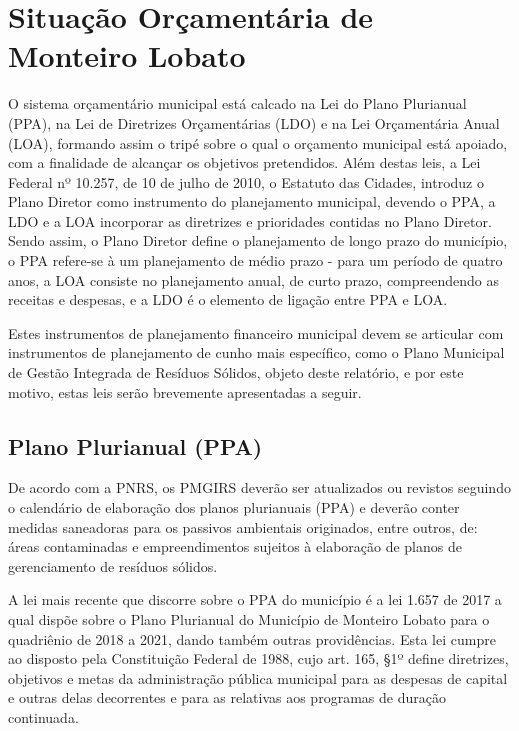 	\section{Situação Orçamentária de Monteiro Lobato}
	
	O sistema orçamentário municipal está calcado na Lei do Plano Plurianual (PPA), na Lei de Diretrizes Orçamentárias (LDO) e na Lei Orçamentária Anual (LOA), formando assim o tripé sobre o qual o orçamento municipal está apoiado, com a finalidade de alcançar os objetivos pretendidos. Além destas leis, a Lei Federal nº 10.257, de 10 de julho de 2010, o Estatuto das Cidades, introduz o Plano Diretor como instrumento do planejamento municipal, devendo o PPA, a LDO e a LOA incorporar as diretrizes e prioridades contidas no Plano Diretor. Sendo assim, o Plano Diretor define o planejamento de longo prazo do município, o PPA refere-se à um planejamento de médio prazo - para um período de quatro anos, a LOA consiste no planejamento anual, de curto prazo, compreendendo as receitas e despesas, e a LDO é o elemento de ligação entre PPA e LOA. 
	
	Estes instrumentos de planejamento financeiro municipal devem se articular com instrumentos de planejamento de cunho mais específico, como o Plano Municipal de Gestão Integrada de Resíduos Sólidos, objeto deste relatório, e por este motivo, estas leis serão brevemente apresentadas a seguir. 
	
	\subsection{Plano Plurianual (PPA)}
	
	De acordo com a PNRS, os PMGIRS deverão ser atualizados ou revistos seguindo o calendário de elaboração dos planos plurianuais (PPA) e deverão conter medidas saneadoras para os passivos ambientais originados, entre outros, de: áreas contaminadas e empreendimentos sujeitos à elaboração de planos de gerenciamento de resíduos sólidos.
	
	A lei mais recente que discorre sobre o PPA do município é a lei 1.657 de 2017 a qual dispõe sobre o Plano Plurianual do Município de Monteiro Lobato para o quadriênio de 2018 a 2021, dando também outras providências. Esta lei cumpre ao disposto pela Constituição Federal de 1988, cujo art. 165, §1º define diretrizes, objetivos e metas da administração pública municipal para as despesas de capital e outras delas decorrentes e para as relativas aos programas de duração continuada. 
	
